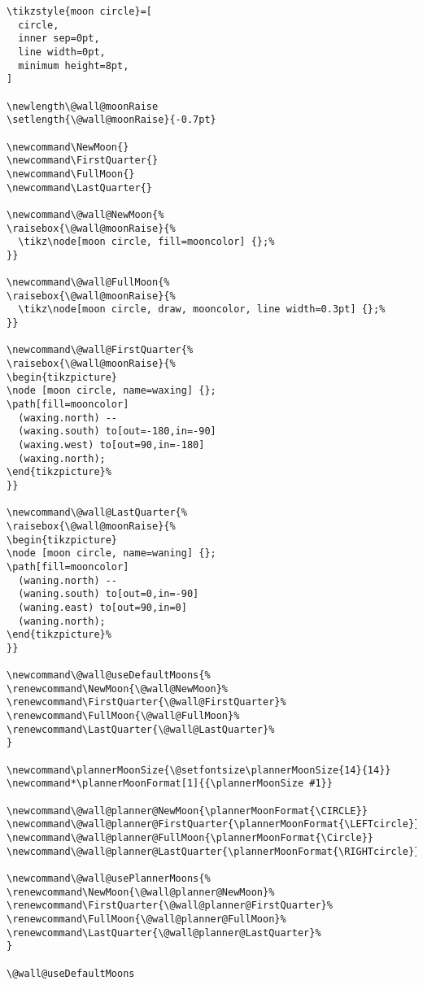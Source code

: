\documentclass[11pt,oneside]{memoir-article}
\begin{document}
\begin{verbatim}
\tikzstyle{moon circle}=[
  circle,
  inner sep=0pt,
  line width=0pt,
  minimum height=8pt,
]

\newlength\@wall@moonRaise
\setlength{\@wall@moonRaise}{-0.7pt}

\newcommand\NewMoon{}
\newcommand\FirstQuarter{}
\newcommand\FullMoon{}
\newcommand\LastQuarter{}

\newcommand\@wall@NewMoon{%
\raisebox{\@wall@moonRaise}{%
  \tikz\node[moon circle, fill=mooncolor] {};%
}}

\newcommand\@wall@FullMoon{%
\raisebox{\@wall@moonRaise}{%
  \tikz\node[moon circle, draw, mooncolor, line width=0.3pt] {};%
}}

\newcommand\@wall@FirstQuarter{%
\raisebox{\@wall@moonRaise}{%
\begin{tikzpicture}
\node [moon circle, name=waxing] {};
\path[fill=mooncolor]
  (waxing.north) --
  (waxing.south) to[out=-180,in=-90]
  (waxing.west) to[out=90,in=-180]
  (waxing.north);
\end{tikzpicture}%
}}

\newcommand\@wall@LastQuarter{%
\raisebox{\@wall@moonRaise}{%
\begin{tikzpicture}
\node [moon circle, name=waning] {};
\path[fill=mooncolor]
  (waning.north) --
  (waning.south) to[out=0,in=-90]
  (waning.east) to[out=90,in=0]
  (waning.north);
\end{tikzpicture}%
}}

\newcommand\@wall@useDefaultMoons{%
\renewcommand\NewMoon{\@wall@NewMoon}%
\renewcommand\FirstQuarter{\@wall@FirstQuarter}%
\renewcommand\FullMoon{\@wall@FullMoon}%
\renewcommand\LastQuarter{\@wall@LastQuarter}%
}

\newcommand\plannerMoonSize{\@setfontsize\plannerMoonSize{14}{14}}
\newcommand*\plannerMoonFormat[1]{{\plannerMoonSize #1}}

\newcommand\@wall@planner@NewMoon{\plannerMoonFormat{\CIRCLE}}
\newcommand\@wall@planner@FirstQuarter{\plannerMoonFormat{\LEFTcircle}}
\newcommand\@wall@planner@FullMoon{\plannerMoonFormat{\Circle}}
\newcommand\@wall@planner@LastQuarter{\plannerMoonFormat{\RIGHTcircle}}

\newcommand\@wall@usePlannerMoons{%
\renewcommand\NewMoon{\@wall@planner@NewMoon}%
\renewcommand\FirstQuarter{\@wall@planner@FirstQuarter}%
\renewcommand\FullMoon{\@wall@planner@FullMoon}%
\renewcommand\LastQuarter{\@wall@planner@LastQuarter}%
}

\@wall@useDefaultMoons
\end{verbatim}
\end{document}
